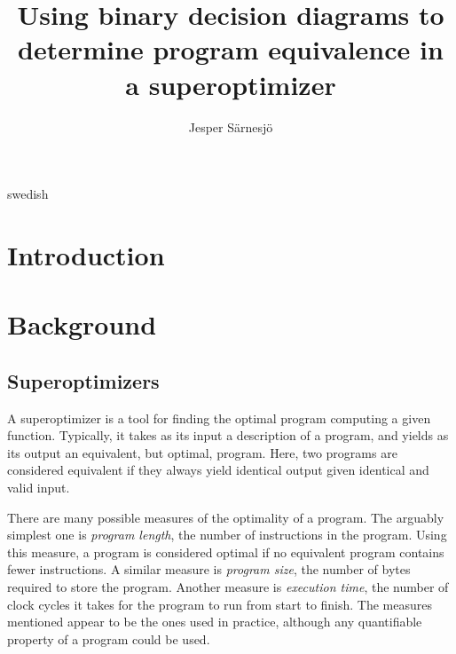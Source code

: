\documentclass[a4paper,11pt]{kth-mag}
\title{Using binary decision diagrams to determine program equivalence in a superoptimizer}
\subtitle{}
\author{Jesper Särnesjö}
\date{}
\begin{document}
\frontmatter

\pagestyle{empty}

\removepagenumbers

\maketitle


\begin{abstract}
\end{abstract}

\clearpage

\begin{foreignabstract}{swedish}
\end{foreignabstract}

\clearpage

\tableofcontents*

\mainmatter

\pagestyle{newchap}

\chapter{Introduction}

\chapter{Background}

\section{Superoptimizers}

A superoptimizer is a tool for finding the optimal program computing a given function.  %
Typically, it takes as its input a description of a program, and yields as its output an equivalent, but optimal, program.
Here, two programs are considered equivalent if they always yield identical output given identical and valid input.

There are many possible measures of the optimality of a program.
The arguably simplest one is \emph{program length}, the number of instructions in the program.
Using this measure, a program is considered optimal if no equivalent program contains fewer instructions.
A similar measure is \emph{program size}, the number of bytes required to store the program. %
Another measure is \emph{execution time}, the number of clock cycles it takes for the program to run from start to finish. %
The measures mentioned appear to be the ones used in practice, although any quantifiable property of a program could be used. %
\end{document}
